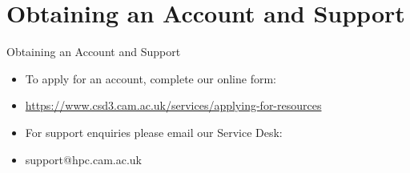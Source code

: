 \section{Obtaining an Account and Support}
\begin{frame}{Obtaining an Account and Support}
\begin{itemize}
\item{To apply for an account, complete our online form:}
\item \small {\url{https://www.csd3.cam.ac.uk/services/applying-for-resources}}
\pause
\item{For support enquiries please email our Service Desk:}
\item{\alert{support@hpc.cam.ac.uk}}
\end{itemize}
\end{frame}